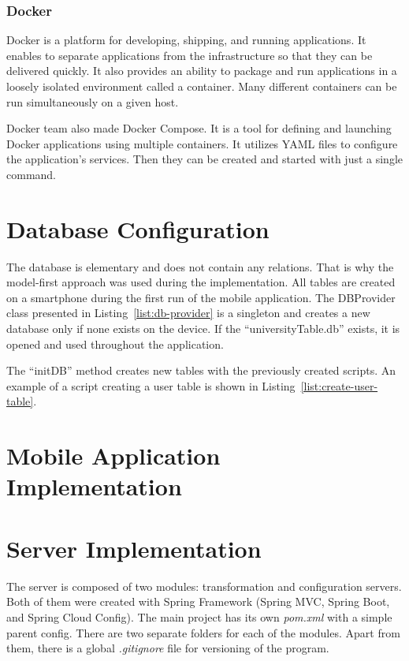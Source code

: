 \subsubsection{Docker}
Docker is a platform for developing, shipping, and running applications. It enables to separate applications from the infrastructure so that they can be delivered quickly. It also provides an ability to package and run applications in a loosely isolated environment called a container. Many different containers can be run simultaneously on a given host.~\cite{docker}

Docker team also made Docker Compose. It is a tool for defining and launching Docker applications using multiple containers. It utilizes YAML files to configure the application’s services. Then they can be created and started with just a single command.~\cite{docker-compose}

\section{Database Configuration}
The database is elementary and does not contain any relations. That is why the model-first approach was used during the implementation. All tables are created on a smartphone during the first run of the mobile application. The DBProvider class presented in Listing~\ref{list:db-provider} is a singleton and creates a new database only if none exists on the device. If the ``universityTable.db'' exists, it is opened and used throughout the application.



 The ``initDB'' method creates new tables with the previously created scripts. An example of a script creating a user table is shown in Listing~\ref{list:create-user-table}.



\section{Mobile Application Implementation}

\section{Server Implementation}
The server is composed of two modules: transformation and configuration servers. Both of them were created with Spring Framework (Spring MVC, Spring Boot, and Spring Cloud Config). The main project has its own \textit{pom.xml} with a simple parent config. There are two separate folders for each of the modules. Apart from them, there is a global \textit{.gitignore} file for versioning of the program.


